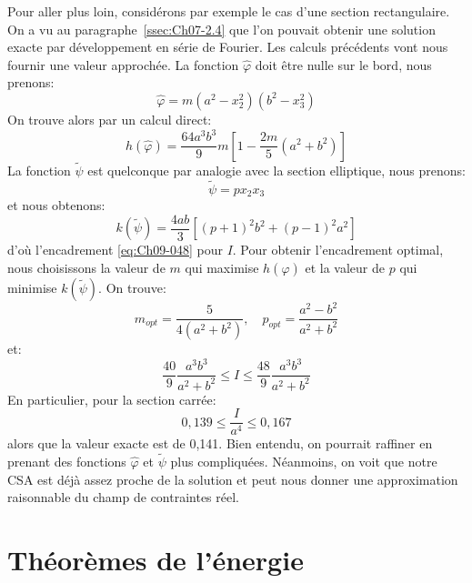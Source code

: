 Pour aller plus loin, considérons par exemple le cas d'une section rectangulaire.
On a vu au paragraphe~\ref{ssec:Ch07-2.4} que l'on pouvait obtenir une solution exacte par développement en série de Fourier.
Les calculs précédents vont nous fournir une valeur approchée.
La fonction $\hat{\varphi}$ doit être nulle sur le bord, nous prenons: 
\begin{equation}
    \hat{\varphi} = m (a^2 - x_2^2) (b^2 -x_3^2)
    \label{eq:Ch09-050}
\end{equation}
On trouve alors par un calcul direct: 
\begin{equation}
    h\left( \hat{\varphi} \right) = \frac{64 a^3 b^3}{9} m \left[ 1 - \frac{2m}{5}\left( a^2 + b^2 \right) \right]
    \label{eq:Ch09-051}
\end{equation}
La fonction $\tilde{\psi}$ est quelconque par analogie avec la section elliptique, nous prenons: 
\begin{equation}
    \tilde{\psi} = p x_2 x_3
    \label{eq:Ch09-052}
\end{equation}
et nous obtenons: 
\begin{equation}
    k\left( \tilde{\psi} \right) = \frac{4 ab}{3} \left[ (p+1)^2 b^2 + (p-1)^2 a^2 \right]
    \label{eq:Ch09-053}
\end{equation}
d'où l'encadrement \eqref{eq:Ch09-048} pour $I$.
Pour obtenir l'encadrement optimal, nous choisissons la valeur de $m$ qui maximise $h(\hat{\varphi})$ et la valeur de $p$ qui minimise $k(\tilde{\psi})$.
On trouve: 
\[
m_{opt} = \frac{5}{4\left( a^2 + b^2\right)}, \quad p_{opt} = \frac{a^2-b^2}{a^2+b^2}
\]
et:
\begin{equation}
    \frac{40}{9} \frac{a^3 b^3}{a^2 + b^2} \leq I \leq \frac{48}{9} \frac{a^3 b^3}{a^2 +b^2}
    \label{eq:Ch09-054}
\end{equation}
En particulier, pour la section carrée:
\begin{equation}
    0{,}139 \leq \frac{I}{a^4} \leq 0{,}167
    \label{eq:Ch09-055}
\end{equation}
alors que la valeur exacte est de 0,141.
Bien entendu, on pourrait raffiner en prenant des fonctions $\hat{\varphi}$ et $\tilde{\psi}$ plus compliquées.
Néanmoins, on voit que notre CSA est déjà assez proche de la solution et peut nous donner une approximation raisonnable du champ de contraintes réel. 
\section{Théorèmes de l'énergie} \label{sec:Ch09-2}
